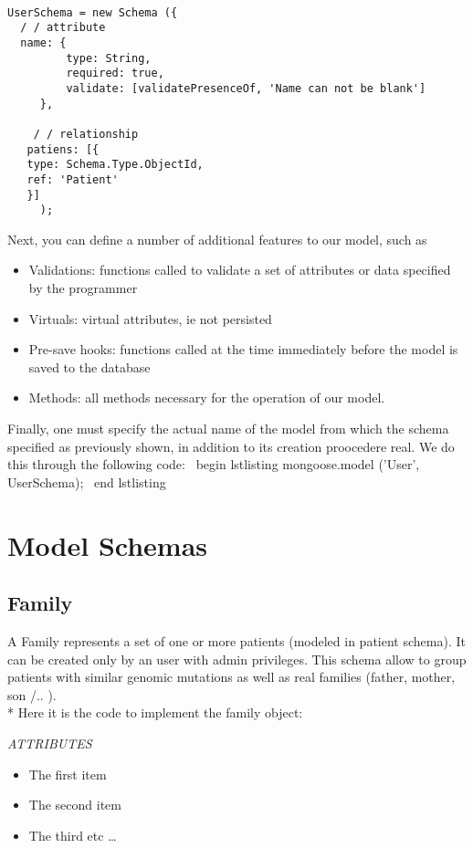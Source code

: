 \begin{lstlisting} 

UserSchema = new Schema ({
  / / attribute
  name: {
         type: String,
         required: true,
         validate: [validatePresenceOf, 'Name can not be blank']
     },

    / / relationship
   patiens: [{
   type: Schema.Type.ObjectId,
   ref: 'Patient'
   }]
     ); 
\end{lstlisting}

Next, you can define a number of additional features to our model, such as

\begin{itemize}
	\item Validations: functions called to validate a set of attributes or data specified by the programmer
	\item Virtuals: virtual attributes, ie not persisted
	\item Pre-save hooks: functions called at the time immediately before the model is saved to the 				database
	\item Methods: all methods necessary for the operation of our model. 
\end{itemize}

Finally, one must specify the actual name of the model from which the schema specified as previously shown, in addition to its creation proocedere real. We do this through the following code:
\ begin {lstlisting}
	mongoose.model ('User', UserSchema);
\ end {lstlisting}

\section{Model Schemas}

\subsection{Family}
A Family represents a set of one or more patients (modeled in patient schema). It can be created only by an user with admin privileges. This schema allow to group patients with similar genomic mutations as well as real families (father, mother, son /{..} ). \\*
Here it is the code to implement the family object: 






\emph{ATTRIBUTES}   
\begin{itemize}
  \item The first item
  \item The second item
  \item The third etc \ldots
\end{itemize}